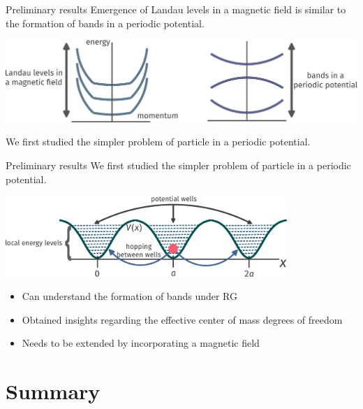 \documentclass[aspectratio=169,t]{beamer}
\begin{document}
\begin{frame}{Preliminary results}
Emergence of \alert{Landau levels} in a magnetic field is similar to the formation of \alert{bands} in a periodic potential.

\vspace*{\fill}
\includegraphics[width=\textwidth]{bands.pdf}

\vspace*{\fill}
We first studied the simpler problem of \alert{particle in a periodic potential}.
\end{frame}

\begin{frame}{Preliminary results}
We first studied the simpler problem of \alert{particle in a periodic potential}.

\vspace*{\fill}
\includegraphics[width=0.8\textwidth]{potential.pdf}

\vspace*{\fill}
	
\begin{itemize}
	\item Can understand the formation of bands under RG
	\item Obtained insights regarding the \alert{effective center of mass} degrees of freedom
	\item Needs to be extended by incorporating a \alert{magnetic field}
\end{itemize}
\end{frame}

\section{Summary}
\subsection{~}
\end{document}

